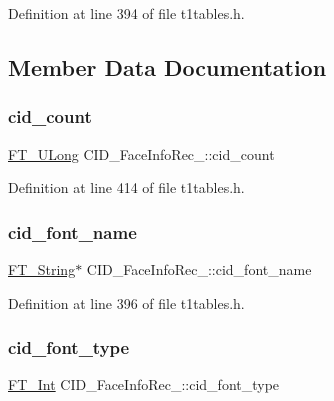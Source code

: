 Definition at line 394 of file t1tables.\+h.



\subsection{Member Data Documentation}
\mbox{\label{struct_c_i_d___face_info_rec___a5eae3fdfaded7bdef4e0bd027ecba595}} 
\subsubsection{\texorpdfstring{cid\_count}{cid\_count}}
{\footnotesize\ttfamily \mbox{\hyperlink{fttypes_8h_a4fac88bdba78eb76b505efa6e4fbf3f5}{F\+T\+\_\+\+U\+Long}} C\+I\+D\+\_\+\+Face\+Info\+Rec\+\_\+\+::cid\+\_\+count}



Definition at line 414 of file t1tables.\+h.

\mbox{\label{struct_c_i_d___face_info_rec___a804ff6d8a672236f258bfe7baf20867a}} 
\subsubsection{\texorpdfstring{cid\_font\_name}{cid\_font\_name}}
{\footnotesize\ttfamily \mbox{\hyperlink{fttypes_8h_a9846214585359eb2ba6bbb0e6de30639}{F\+T\+\_\+\+String}}$\ast$ C\+I\+D\+\_\+\+Face\+Info\+Rec\+\_\+\+::cid\+\_\+font\+\_\+name}



Definition at line 396 of file t1tables.\+h.

\mbox{\label{struct_c_i_d___face_info_rec___a83ce2384925f2fec44a823cf635abe8c}} 
\subsubsection{\texorpdfstring{cid\_font\_type}{cid\_font\_type}}
{\footnotesize\ttfamily \mbox{\hyperlink{fttypes_8h_af90e5fb0d07e21be9fe6faa33f02484c}{F\+T\+\_\+\+Int}} C\+I\+D\+\_\+\+Face\+Info\+Rec\+\_\+\+::cid\+\_\+font\+\_\+type}




